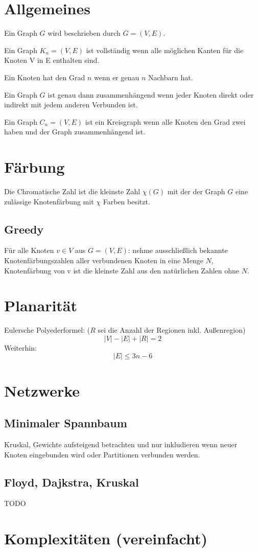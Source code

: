 \documentclass[10pt,a4paper]{article}
\begin{document}
\section{Allgemeines}
Ein Graph $G$ wird beschrieben durch $G = (V, E)$.

Ein Graph $K_n = (V, E)$ ist vollständig wenn alle möglichen Kanten für die Knoten V in E enthalten sind.

Ein Knoten hat den Grad $n$ wenn er genau $n$ Nachbarn hat.

Ein Graph $G$ ist genau dann zusammenhängend wenn jeder Knoten direkt oder indirekt mit jedem anderen Verbunden ist.

Ein Graph $C_n = (V, E)$ ist ein Kreisgraph wenn alle Knoten den Grad zwei haben und der Graph zusammenhängend ist.
\section{Färbung}
Die Chromatische Zahl ist die kleinste Zahl $\chi(G)$ mit der der Graph $G$ eine zulässige Knotenfärbung mit $\chi$ Farben besitzt.

\subsection{Greedy}
Für alle Knoten $v \in V$ aus $G = (V, E)$: nehme ausschließlich bekannte Knotenfärbungszahlen aller verbundenen Knoten in eine Menge $N$, Knotenfärbung von v ist die kleinste Zahl aus den natürlichen Zahlen ohne $N$.
\section{Planarität}
Eulersche Polyederformel: ($R$ sei die Anzahl der Regionen inkl. Außenregion)
\[|V|-|E|+|R|=2\]
Weiterhin:
\[|E| \leq 3n -6\]
\section{Netzwerke}
\subsection{Minimaler Spannbaum}
Kruskal, Gewichte aufsteigend betrachten und nur inkludieren wenn neuer Knoten eingebunden wird oder Partitionen verbunden werden.
\subsection{Floyd, Dajkstra, Kruskal}
TODO
\section{Komplexitäten (vereinfacht)}
\end{document}
